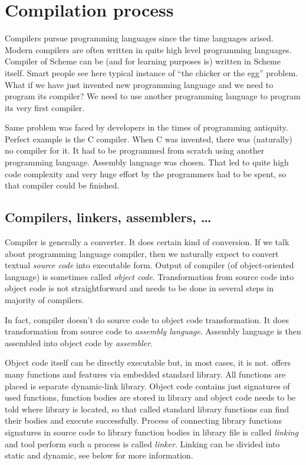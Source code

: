 \chapter{Compilation process}\label{section:compilation}
Compilers pursue programming languages since the time languages arised. Modern compilers are often written in quite high level programming languages. Compiler of Scheme can be (and for learning purposes is) written in Scheme itself. Smart people see here typical instance of \enquote{the chicker or the egg} problem. What if we have just invented new programming language and we need to program its compiler? We need to use another programming language to program its very first compiler.

Same problem was faced by developers in the times of programming antiquity. Perfect example is the C compiler. When C was invented, there was (naturally) no compiler for it. It had to be programmed from scratch using another programming language. Assembly language was chosen. That led to quite high code complexity and very huge effort by the programmers had to be spent, so that compiler could be finished.

\section{Compilers, linkers, assemblers, \ldots}
Compiler is generally a converter. It does certain kind of conversion. If we talk about programming language compiler, then we naturally expect to convert textual \textit{source code} into executable form. Output of compiler (of object-oriented language) is sometimes called \textit{object code}. Transformation from source code into object code is not straightforward and needs to be done in several steps in majority of \cpp{} compilers.

In fact, compiler doesn't do source code to object code transformation. It does transformation from source code to \textit{assembly language}. Assembly language is then assembled into object code by \textit{assembler}.

Object code itself can be directly executable but, in most cases, it is not. \cpp{} offers many functions and features via embedded standard library. All functions are placed is separate dynamic-link library. Object code contains just signatures of used functions, function bodies are stored in library and object code needs to be told where library is located, so that called standard library functions can find their bodies and execute successfully. Process of connecting library functions signatures in source code to library function bodies in library file is called \textit{linking} and tool perform such a process is called \textit{linker}. Linking can be divided into static and dynamic, see below for more information.

